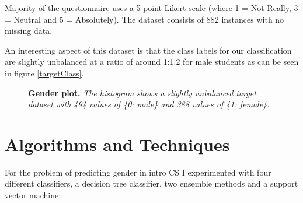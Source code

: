 Majority of the questionnaire uses a 5-point Likert scale (where 1 = Not Really, 3 = Neutral and 5 = Absolutely). The dataset consists of 882 instances with no missing data.



An interesting aspect of this dataset is that the class labels for our classification are slightly unbalanced at a ratio of around 1:1.2 for male students as can be seen in figure \ref{targetClass}. 

\begin{figure}[!hbtp]
\centering
    
    \caption{\textbf{Gender plot. }\textit{The histogram shows a slightly unbalanced target dataset with 494 values of \{0: male\} and 388 values of \{1: female\}.}}
\end{figure}



\section*{Algorithms and Techniques}

For the problem of predicting gender in intro CS I experimented with four different classifiers, a decision tree classifier, two ensemble methods and a support vector machine:

